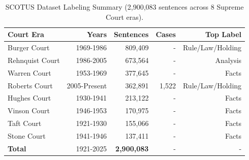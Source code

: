 \begin{table}[t]
\centering
\caption{SCOTUS Dataset Labeling Summary (2,900,083 sentences across 8 Supreme Court eras).}
\label{tab:scotus}
\small
\begin{tabular}{lrrrr}
\toprule
\textbf{Court Era} & \textbf{Years} & \textbf{Sentences} & \textbf{Cases} & \textbf{Top Label} \\
\midrule
Burger Court & 1969-1986 & 809,409 & - & Rule/Law/Holding \\
Rehnquist Court & 1986-2005 & 673,564 & - & Analysis \\
Warren Court & 1953-1969 & 377,645 & - & Facts \\
Roberts Court & 2005-Present & 362,891 & 1,522 & Rule/Law/Holding \\
Hughes Court & 1930-1941 & 213,122 & - & Facts \\
Vinson Court & 1946-1953 & 170,975 & - & Facts \\
Taft Court & 1921-1930 & 155,066 & - & Facts \\
Stone Court & 1941-1946 & 137,411 & - & Facts \\
\midrule
\textbf{Total} & 1921-2025 & \textbf{2,900,083} & - & - \\
\bottomrule
\end{tabular}
\end{table}
